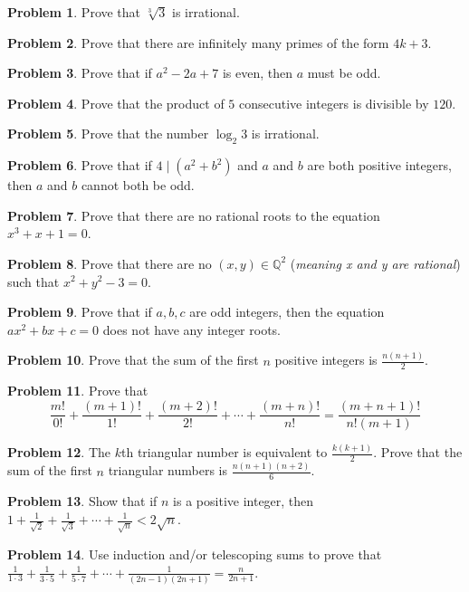 \documentclass[12pt,openany]{book}
\theoremstyle{definition}
\newtheorem{prob}{Problem}[section]
\theoremstyle{definition}
\begin{document}
\begin{prob}  Prove that $\sqrt[3]{3}$ is irrational.  \end{prob}
\begin{prob}  Prove that there are infinitely many primes of the form $4k+3$.  \end{prob}
\begin{prob}  Prove that if $a^2-2a+7$ is even, then $a$ must be odd.  \end{prob}
\begin{prob}  Prove that the product of $5$ consecutive integers is divisible by $120$.  \end{prob}
\begin{prob}  Prove that the number $\log_{2}3$ is irrational.  \end{prob}
\begin{prob}  Prove that if $4\mid (a^2+b^2)$ and $a$ and $b$ are both positive integers, then $a$ and $b$ cannot both be odd. \end{prob}  
\begin{prob}  Prove that there are no rational roots to the equation $x^3+x+1=0$.  \end{prob}  
\begin{prob}  Prove that there are no $(x,y)\in \mathbb{Q}^2$ (\textit{meaning x and y are rational}) such that $x^2+y^2-3=0$.  \end{prob}
\begin{prob}  Prove that if $a,b,c$ are odd integers, then the equation $ax^2+bx+c=0$ does not have any integer roots.  \end{prob}
\begin{prob}  Prove that the sum of the first $n$ positive integers is $\frac{n(n+1)}{2}$.  \end{prob}
\begin{prob}  Prove that $$\frac{m!}{0!}+\frac{(m+1)!}{1!}+\frac{(m+2)!}{2!}+\cdots+\frac{(m+n)!}{n!}=\frac{(m+n+1)!}{n!(m+1)}$$ \end{prob}  
\begin{prob}  The $k$th triangular number is equivalent to $\frac{k(k+1)}{2}$.  Prove that the sum of the first $n$ triangular numbers is $\frac{n(n+1)(n+2)}{6}$.  \end{prob}
\begin{prob}  Show that if $n$ is a positive integer, then $1+\frac{1}{\sqrt2}+\frac{1}{\sqrt3}+\cdots+\frac{1}{\sqrt{n}}<2\sqrt{n}$.  \end{prob}
\begin{prob}  Use induction and/or telescoping sums to prove that $\frac{1}{1\cdot 3}+\frac{1}{3\cdot 5}+\frac{1}{5\cdot 7}+\cdots +\frac{1}{(2n-1)(2n+1)}=\frac{n}{2n+1}$.  \end{prob}
\end{document}
